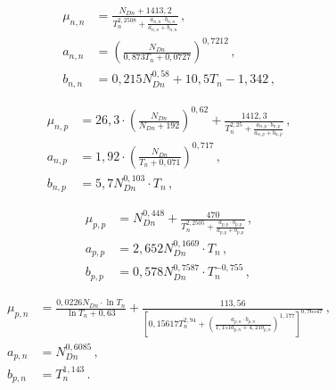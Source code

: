 \documentclass[10pt,a5paper,titlepage,oneside]{book}
\numberwithin{equation}{part}
\begin{document}
\begin{subequations} \label{eqNN}
    \begin{align}
      \mu_{n,n}& =\frac{N_{Dn}+1413,2}{T_n^{2,2508}+\frac{a_{n,n}\cdot b_{n,n}}{a_{n,n}+b_{n,n}}}\,, \label{eqNNa} \\
      a_{n,n} &=\left(\frac{N_{Dn}}{0,873T_n+0,0727}\right)^{0,7212}\,, \label{eqNNb} \\
      b_{n,n}& =0,215N_{Dn}^{0,58}+10,5T_n-1,342\,, \label{eqNNc} 
    \end{align}
\end{subequations}

\begin{subequations} \label{eqNP}
    \begin{align}
      \mu_{n,p}& =26,3\cdot\left(\frac{N_{Dn}}{N_{Dn}+192}\right)^{0,62}+\frac{1412,3}{T_n^{2,25}+\frac{a_{n,p}\cdot b_{n,p}}{a_{n,p}+b_{n,p}}}\,, \label{eqNPa} \\
      a_{n,p} &=1,92\cdot\left(\frac{N_{Dn}}{T_n+0,071}\right)^{0,717}\,, \label{eqNPb} \\
      b_{n,p}& =5,7N_{Dn}^{0,103}\cdot T_n\,, \label{eqNPc}
    \end{align}
\end{subequations}


\begin{subequations} \label{eqPP}
    \begin{align}
      \mu_{p,p}& =N_{Dn}^{0,448}+\frac{470}{T_n^{2,2505}+\frac{a_{p,p}\cdot b_{p,p}}{a_{p,p}+b_{p,p}}}\,, \label{eqPPa} \\
      a_{p,p} &=2,652 N_{Dn}^{0,1669}\cdot T_n\,, \label{eqPPb} \\
      b_{p,p}& =0,578 N_{Dn}^{0,7587}\cdot T_n^{-0,755}\,, \label{eqPPc}
    \end{align}
\end{subequations}


\begin{subequations} \label{eqPN}
    \begin{align}
      \mu_{p,n}& =\frac{0,0226N_{Dn}\cdot\ln T_n}{\ln T_n+0,63}
      +\frac{113,56}{\left[0,15617T_n^{2,94}+\left(\frac{a_{p,n}\cdot b_{p,n}}{1,151a_{p,n}+ 4,21 b_{p,n}}\right)^{1,177}\right]^{0,76547}}\,, \label{eqPNa} \\
      a_{p,n} &=N_{Dn}^{0,6085}\,, \label{eqPNb} \\
      b_{p,n}& =T_n^{1,143}\,. \label{eqPNc}
    \end{align}
\end{subequations}
\end{document}
